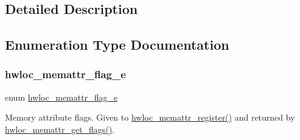 \subsection{Detailed Description}


\subsection{Enumeration Type Documentation}
\mbox{\label{a00212_ga78aceb4cac4d614c0f5e82dbfeb779e5}} 
\subsubsection{\texorpdfstring{hwloc\+\_\+memattr\+\_\+flag\+\_\+e}{hwloc\_memattr\_flag\_e}}
{\footnotesize\ttfamily enum \hyperlink{a00212_ga78aceb4cac4d614c0f5e82dbfeb779e5}{hwloc\+\_\+memattr\+\_\+flag\+\_\+e}}



Memory attribute flags. Given to \hyperlink{a00212_ga770657d1e44b09e93e09f623936c1e5f}{hwloc\+\_\+memattr\+\_\+register()} and returned by \hyperlink{a00212_ga4c62b626085adeaffb233e5f2a03a5eb}{hwloc\+\_\+memattr\+\_\+get\+\_\+flags()}. 

